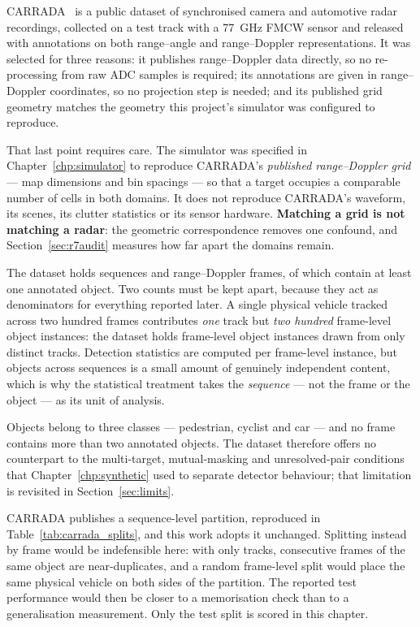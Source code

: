 CARRADA~\cite{ouaknine2021carrada} is a public dataset of synchronised camera and automotive radar
recordings, collected on a test track with a \SI{77}{\giga\hertz} FMCW sensor and released with
annotations on both range--angle and range--Doppler representations. It was selected for three
reasons: it publishes range--Doppler data directly, so no re-processing from raw ADC samples is
required; its annotations are given in range--Doppler coordinates, so no projection step is needed;
and its published grid geometry matches the geometry this project's simulator was configured to
reproduce.

That last point requires care. The simulator was specified in Chapter~\ref{chp:simulator} to
reproduce CARRADA's \emph{published range--Doppler grid} --- map dimensions and bin spacings --- so
that a target occupies a comparable number of cells in both domains. It does not reproduce
CARRADA's waveform, its scenes, its clutter statistics or its sensor hardware. \textbf{Matching a
grid is not matching a radar}: the geometric correspondence removes one confound, and
Section~\ref{sec:r7audit} measures how far apart the domains remain.

The dataset holds \CarradaSequences{} sequences and \CarradaFrames{} range--Doppler frames, of
which \CarradaAnnotatedFrames{} contain at least one annotated object. Two counts must be kept
apart, because they act as denominators for everything reported later. A single physical vehicle
tracked across two hundred frames contributes \emph{one} track but \emph{two hundred} frame-level
object instances: the dataset holds \CarradaObjectFrames{} frame-level object instances drawn from
only \CarradaTracks{} distinct tracks. Detection statistics are computed per frame-level instance,
but \CarradaTracks{} objects across \CarradaSequences{} sequences is a small amount of genuinely
independent content, which is why the statistical treatment takes the \emph{sequence} --- not the
frame or the object --- as its unit of analysis.

Objects belong to three classes --- pedestrian, cyclist and car --- and no frame contains more than
two annotated objects. The dataset therefore offers no counterpart to the multi-target,
mutual-masking and unresolved-pair conditions that Chapter~\ref{chp:synthetic} used to separate
detector behaviour; that limitation is revisited in Section~\ref{sec:limits}.

CARRADA publishes a sequence-level partition, reproduced in Table~\ref{tab:carrada_splits}, and this
work adopts it unchanged. Splitting instead by frame would be indefensible here: with only
\CarradaTracks{} tracks, consecutive frames of the same object are near-duplicates, and a random
frame-level split would place the same physical vehicle on both sides of the partition. The reported
test performance would then be closer to a memorisation check than to a generalisation measurement.
Only the test split is scored in this chapter.

